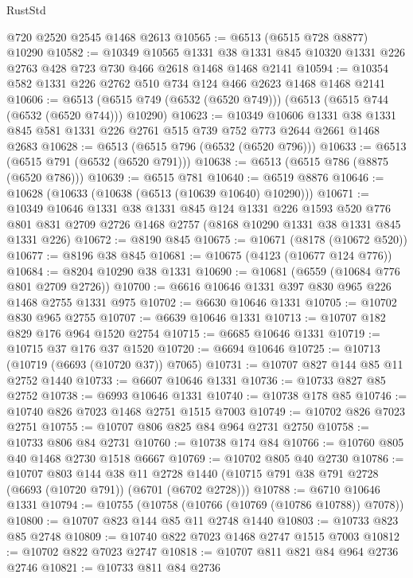 \begin{lexlean}{RustStd}
\begin{coremodule}
    @720
    @2520
    @2545
    @1468
    @2613
@10565 := @6513 (@6515 @728 @8877) @10290
@10582 := @10349
    @10565
    @1331
    @38
    @1331
    @845
    @10320
    @1331
    @226
    @2763
    @428
    @723
    @730
    @466
    @2618
    @1468
    @1468
    @2141
@10594 := @10354 @582 @1331 @226 @2762 @510 @734 @124 @466 @2623 @1468 @1468 @2141
@10606 := @6513 (@6515 @749 (@6532 (@6520 @749))) (@6513 (@6515 @744 (@6532 (@6520 @744))) @10290)
@10623 := @10349
    @10606
    @1331
    @38
    @1331
    @845
    @581
    @1331
    @226
    @2761
    @515
    @739
    @752
    @773
    @2644
    @2661
    @1468
    @2683
@10628 := @6513 (@6515 @796 (@6532 (@6520 @796)))
@10633 := @6513 (@6515 @791 (@6532 (@6520 @791)))
@10638 := @6513 (@6515 @786 (@8875 (@6520 @786)))
@10639 := @6515 @781
@10640 := @6519 @8876
@10646 := @10628 (@10633 (@10638 (@6513 (@10639 @10640) @10290)))
@10671 := @10349
    @10646
    @1331
    @38
    @1331
    @845
    @124
    @1331
    @226
    @1593
    @520
    @776
    @801
    @831
    @2709
    @2726
    @1468
    @2757
    (@8168 @10290 @1331 @38 @1331 @845 @1331 @226)
@10672 := @8190 @845
@10675 := @10671 (@8178 (@10672 @520))
@10677 := @8196 @38 @845
@10681 := @10675 (@4123 (@10677 @124 @776))
@10684 := @8204 @10290 @38 @1331
@10690 := @10681 (@6559 (@10684 @776 @801 @2709 @2726))
@10700 := @6616 @10646 @1331 @397 @830 @965 @226 @1468 @2755 @1331 @975
@10702 := @6630 @10646 @1331
@10705 := @10702 @830 @965 @2755
@10707 := @6639 @10646 @1331
@10713 := @10707 @182 @829 @176 @964 @1520 @2754
@10715 := @6685 @10646 @1331
@10719 := @10715 @37 @176 @37 @1520
@10720 := @6694 @10646
@10725 := @10713 (@10719 (@6693 (@10720 @37)) @7065)
@10731 := @10707 @827 @144 @85 @11 @2752 @1440
@10733 := @6607 @10646 @1331
@10736 := @10733 @827 @85 @2752
@10738 := @6993 @10646 @1331
@10740 := @10738 @178 @85
@10746 := @10740 @826 @7023 @1468 @2751 @1515 @7003
@10749 := @10702 @826 @7023 @2751
@10755 := @10707 @806 @825 @84 @964 @2731 @2750
@10758 := @10733 @806 @84 @2731
@10760 := @10738 @174 @84
@10766 := @10760 @805 @40 @1468 @2730 @1518 @6667
@10769 := @10702 @805 @40 @2730
@10786 := @10707
    @803
    @144
    @38
    @11
    @2728
    @1440
    (@10715 @791 @38 @791 @2728 (@6693 (@10720 @791)) (@6701 (@6702 @2728)))
@10788 := @6710 @10646 @1331
@10794 := @10755 (@10758 (@10766 (@10769 (@10786 @10788)) @7078))
@10800 := @10707 @823 @144 @85 @11 @2748 @1440
@10803 := @10733 @823 @85 @2748
@10809 := @10740 @822 @7023 @1468 @2747 @1515 @7003
@10812 := @10702 @822 @7023 @2747
@10818 := @10707 @811 @821 @84 @964 @2736 @2746
@10821 := @10733 @811 @84 @2736

\end{coremodule}
\end{lexlean}
